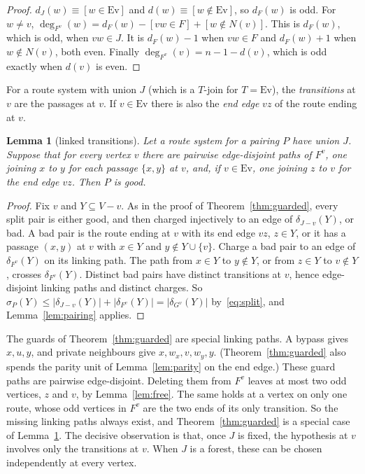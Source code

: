 \documentclass[11pt]{amsart}
\newtheorem{lemma}[theorem]{Lemma}
\theoremstyle{definition}
\newcommand{\Ev}{\mathrm{Ev}}
\begin{document}
\begin{proof}
$d_J(w)\equiv[w\in\Ev]$ and $d(w)\equiv[w\notin\Ev]$, so $d_F(w)$ is odd. For $w\neq v$,
$\deg_{F^v}(w)=d_F(w)-[vw\in F]+[w\notin N(v)]$. This is $d_F(w)$, which is odd, when $vw\in J$. It is
$d_F(w)-1$ when $vw\in F$ and $d_F(w)+1$ when $w\notin N(v)$, both even. Finally
$\deg_{F^v}(v)=n-1-d(v)$, which is odd exactly when $d(v)$ is even.
\end{proof}

For a route system with union $J$ (which is a $T$-join for $T=\Ev$), the \emph{transitions} at $v$
are the passages at $v$. If $v\in\Ev$ there is also the \emph{end edge} $vz$ of the route ending at
$v$.

\begin{lemma}[linked transitions]\label{lem:linked}
Let a route system for a pairing $P$ have union $J$. Suppose that for every vertex $v$ there are pairwise edge-disjoint paths of $F^v$, one joining $x$
to $y$ for each passage $\{x,y\}$ at $v$, and, if $v\in\Ev$, one joining $z$ to $v$ for the end
edge $vz$. Then $P$ is good.
\end{lemma}

\begin{proof}
Fix $v$ and $Y\subseteq V-v$. As in the proof of Theorem~\ref{thm:guarded}, every split pair is either
good, and then charged injectively to an edge of $\delta_{J-v}(Y)$, or bad. A bad pair is the route
ending at $v$ with its end edge $vz$, $z\in Y$, or it has a passage $(x,y)$ at $v$ with $x\in Y$ and
$y\notin Y\cup\{v\}$. Charge a bad pair to an edge of $\delta_{F^v}(Y)$ on its linking path. The path
from $x\in Y$ to $y\notin Y$, or from $z\in Y$ to $v\notin Y$, crosses $\delta_{F^v}(Y)$. Distinct bad
pairs have distinct transitions at $v$, hence edge-disjoint linking paths and distinct charges. So
$\sigma_P(Y)\le|\delta_{J-v}(Y)|+|\delta_{F^v}(Y)|=|\delta_{G^v}(Y)|$ by~\eqref{eq:split}, and
Lemma~\ref{lem:pairing} applies.
\end{proof}

The guards of Theorem~\ref{thm:guarded} are special linking paths. A bypass gives $x,u,y$, and private
neighbours give $x,w_x,v,w_y,y$. (Theorem~\ref{thm:guarded} also spends the parity unit of
Lemma~\ref{lem:parity} on the end edge.) These guard paths are pairwise edge-disjoint. Deleting them
from $F^v$ leaves at most two odd vertices, $z$ and $v$, by Lemma~\ref{lem:free}. The same holds at a
vertex on only one route, whose odd vertices in $F^v$ are the two ends of its only transition. So the
missing linking paths always exist, and Theorem~\ref{thm:guarded} is a special case of
Lemma~\ref{lem:linked}. The decisive observation is that, once $J$ is fixed, the
hypothesis at $v$ involves only the transitions at $v$. When $J$ is a forest, these can be chosen
independently at every vertex.
\end{document}
